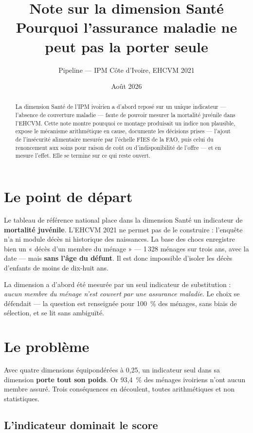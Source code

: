 \documentclass[11pt,a4paper]{article}
\title{\bfseries Note sur la dimension Santé\\[4pt]
\large Pourquoi l'assurance maladie ne peut pas la porter seule}
\author{Pipeline \col{PythonIPM} --- IPM Côte d'Ivoire, EHCVM 2021}
\date{Août 2026}
\begin{document}
\maketitle

\begin{abstract}
\noindent La dimension Santé de l'IPM ivoirien a d'abord reposé sur un unique indicateur ---
l'absence de couverture maladie --- faute de pouvoir mesurer la mortalité juvénile dans l'EHCVM.
Cette note montre pourquoi ce montage produisait un indice non plausible, expose le mécanisme
arithmétique en cause, documente les décisions prises --- l'ajout de l'insécurité alimentaire mesurée
par l'échelle FIES de la FAO, puis celui du renoncement aux soins pour raison de coût ou
d'indisponibilité de l'offre --- et en
mesure l'effet. Elle se termine sur ce qui reste ouvert.
\end{abstract}

\section{Le point de départ}

Le tableau de référence national place dans la dimension Santé un indicateur de \textbf{mortalité
juvénile}. L'EHCVM 2021 ne permet pas de le construire : l'enquête n'a ni module décès ni
historique des naissances. La base des chocs enregistre bien un « décès d'un membre du ménage »
--- 1\,328 ménages sur trois ans, avec la date --- mais \textbf{sans l'âge du défunt}. Il est donc
impossible d'isoler les décès d'enfants de moins de dix-huit ans.

La dimension a d'abord été mesurée par un seul indicateur de substitution : \emph{aucun membre du
ménage n'est couvert par une assurance maladie}. Le choix se défendait --- la question est
renseignée pour 100~\% des ménages, sans biais de sélection, et se lit sans ambiguïté.

\section{Le problème}

Avec quatre dimensions équipondérées à 0,25, un indicateur seul dans sa dimension \textbf{porte
tout son poids}. Or 93,4~\% des ménages ivoiriens n'ont aucun membre assuré. Trois conséquences
en découlent, toutes arithmétiques et non statistiques.

\subsection{L'indicateur dominait le score}
\end{document}

